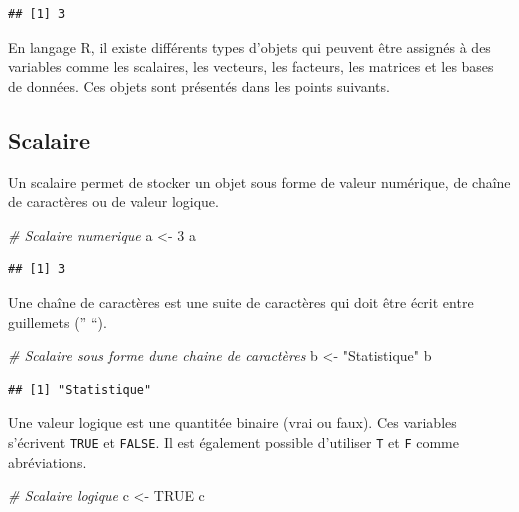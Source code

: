 \documentclass[
]{book}
\newenvironment{Shaded}{\begin{snugshade}}{\end{snugshade}}
\newcommand{\CommentTok}[1]{\textcolor[rgb]{0.56,0.35,0.01}{\textit{#1}}}
\newcommand{\ConstantTok}[1]{\textcolor[rgb]{0.56,0.35,0.01}{#1}}
\newcommand{\DecValTok}[1]{\textcolor[rgb]{0.00,0.00,0.81}{#1}}
\newcommand{\NormalTok}[1]{#1}
\newcommand{\OtherTok}[1]{\textcolor[rgb]{0.56,0.35,0.01}{#1}}
\newcommand{\StringTok}[1]{\textcolor[rgb]{0.31,0.60,0.02}{#1}}
\begin{document}
\begin{verbatim}
## [1] 3
\end{verbatim}

En langage R, il existe différents types d'objets qui peuvent être assignés à des variables comme les scalaires, les vecteurs, les facteurs, les matrices et les bases de données. Ces objets sont présentés dans les points suivants.

\subsection{Scalaire}\label{scalaire}

Un scalaire permet de stocker un objet sous forme de valeur numérique, de chaîne de caractères ou de valeur logique.

\begin{Shaded}
\begin{Highlighting}[]
\CommentTok{\# Scalaire numerique}
\NormalTok{a }\OtherTok{\textless{}{-}} \DecValTok{3}
\NormalTok{a}
\end{Highlighting}
\end{Shaded}

\begin{verbatim}
## [1] 3
\end{verbatim}

Une chaîne de caractères est une suite de caractères qui doit être écrit entre guillemets ('' ``).

\begin{Shaded}
\begin{Highlighting}[]
\CommentTok{\# Scalaire sous forme d\textquotesingle{}une chaine de caractères}
\NormalTok{b }\OtherTok{\textless{}{-}} \StringTok{"Statistique"}
\NormalTok{b}
\end{Highlighting}
\end{Shaded}

\begin{verbatim}
## [1] "Statistique"
\end{verbatim}

Une valeur logique est une quantitée binaire (vrai ou faux). Ces variables s'écrivent \texttt{TRUE} et \texttt{FALSE}. Il est également possible d'utiliser \texttt{T} et \texttt{F} comme abréviations.

\begin{Shaded}
\begin{Highlighting}[]
\CommentTok{\# Scalaire logique}
\NormalTok{c }\OtherTok{\textless{}{-}} \ConstantTok{TRUE}
\NormalTok{c}
\end{Highlighting}
\end{Shaded}
\end{document}
